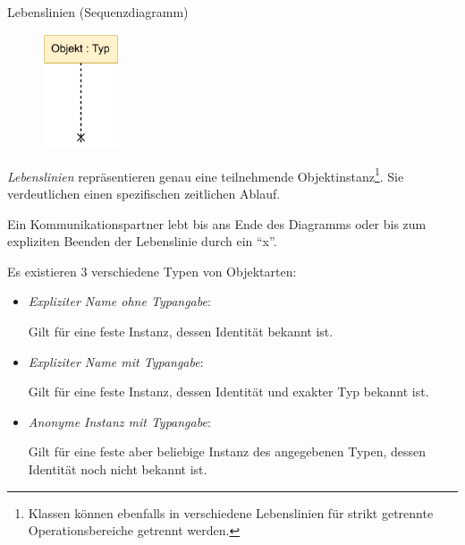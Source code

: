 \begin{diag}{Lebenslinien (Sequenzdiagramm)}
    \begin{figure}
        \centering
        \includegraphics[width=0.2\textwidth]{includes/figures/defi_diagrams_sequenz_object.pdf}
    \end{figure}
    \emph{Lebenslinien} repräsentieren genau eine teilnehmende Objektinstanz\footnote{Klassen können ebenfalls in verschiedene Lebenslinien für strikt getrennte Operationsbereiche getrennt werden.}.
    Sie verdeutlichen einen spezifischen zeitlichen Ablauf.

    Ein Kommunikationspartner lebt bis ans Ende des Diagramms oder bis zum expliziten Beenden der Lebenslinie durch ein \enquote{x}.

    Es existieren 3 verschiedene Typen von Objektarten:
    \begin{itemize}
        \item \emph{Expliziter Name ohne Typangabe}:

              Gilt für eine feste Instanz, dessen Identität bekannt ist.
        \item \emph{Expliziter Name mit Typangabe}:

              Gilt für eine feste Instanz, dessen Identität und exakter Typ bekannt ist.
        \item \emph{Anonyme Instanz mit Typangabe}:

              Gilt für eine feste aber beliebige Instanz des angegebenen Typen, dessen Identität noch nicht bekannt ist.
    \end{itemize}
\end{diag}

